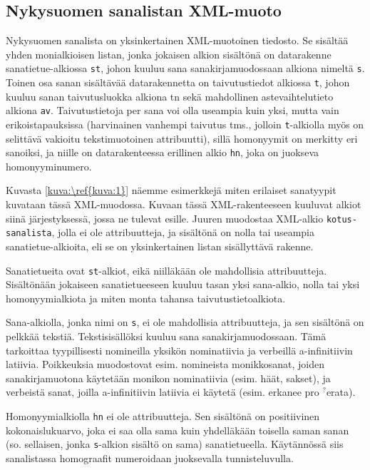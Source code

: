 \documentclass[free]{flammie}
\begin{document}
\subsection{Nykysuomen sanalistan XML-muoto} \label{subsec:21}

Nykysuomen sanalista on yksinkertainen XML-muotoinen tiedosto. Se sisältää yhden
monialkioisen listan, jonka jokaisen alkion sisältönä on datarakenne
sanatietue-alkiossa \texttt{st}, johon kuuluu sana sanakirjamuodossaan alkiona
nimeltä \texttt{s}.
Toinen osa sanan sisältävää datarakennetta on taivutustiedot alkiossa \texttt{t}, johon
kuuluu sanan taivutusluokka alkiona tn sekä mahdollinen astevaihtelutieto
alkiona \texttt{av}. Taivutustietoja per sana voi olla useampia kuin yksi, mutta vain
erikoistapauksissa (harvinainen vanhempi taivutus tms., jolloin \texttt{t}-alkiolla myös
on selittävä vakioitu tekstimuotoinen attribuutti), sillä homonyymit on merkitty
eri sanoiksi, ja niille on datarakenteessa erillinen alkio \texttt{hn}, joka on juokseva
homonyyminumero.

Kuvasta \ref{kuva:\ref{kuva:1}} näemme esimerkkejä miten erilaiset sanatyypit
kuvataan tässä XML-muodossa. Kuvaan tässä XML-rakenteeseen kuuluvat alkiot siinä
järjestyksessä, jossa ne tulevat esille. Juuren muodostaa XML-alkio
\texttt{kotus-sanalista}, jolla
ei ole attribuutteja, ja sisältönä on nolla tai useampia sanatietue-alkioita, eli se on
yksinkertainen listan sisällyttävä rakenne.

Sanatietueita ovat \texttt{st}-alkiot, eikä niilläkään ole mahdollisia attribuutteja. Sisältönään jokaiseen sanatietueeseen kuuluu tasan yksi sana-alkio, nolla tai yksi homonyymialkiota ja miten monta tahansa taivutustietoalkiota.

Sana-alkiolla, jonka nimi on \texttt{s}, ei ole mahdollisia attribuutteja, ja sen sisältönä on
pelkkää tekstiä. Tekstisisällöksi kuuluu sana sanakirjamuodossaan. Tämä tarkoittaa tyypillisesti nomineilla yksikön nominatiivia ja verbeillä a-infinitiivin latiivia.
Poikkeuksia muodostovat esim. nomineista monikkosanat, joiden sanakirjamuotona käytetään monikon nominatiivia (esim. häät, sakset), ja verbeistä sanat, joilla
a-infinitiivin latiivia ei käytetä (esim. erkanee pro $^?$erata).

Homonyymialkiolla \texttt{hn} ei ole attribuutteja. Sen sisältönä on positiivinen kokonaislukuarvo, joka ei saa olla sama kuin yhdelläkään toisella saman sanan (so.
sellaisen, jonka \texttt{s}-alkion sisältö on sama) sanatietueella. Käytännössä siis sanalistassa homograafit numeroidaan juoksevalla tunnisteluvulla.
\end{document}
